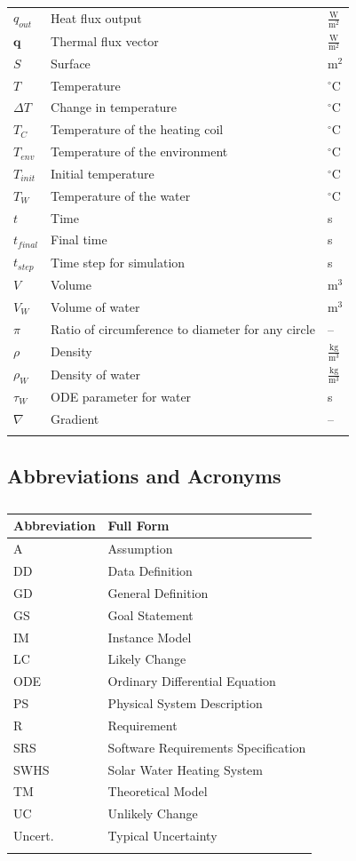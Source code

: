 \documentclass[12pt]{article}
\begin{document}
\begin{longtabu}{l X[l] l}
\\
${q_{out}}$ & Heat flux output & $\frac{\text{W}}{\text{m}^{2}}$
\\
$\mathbf{q}$ & Thermal flux vector & $\frac{\text{W}}{\text{m}^{2}}$
\\
$S$ & Surface & $\text{m}^{2}$
\\
$T$ & Temperature & ${}^{\circ}$C
\\
$ΔT$ & Change in temperature & ${}^{\circ}$C
\\
${T_{C}}$ & Temperature of the heating coil & ${}^{\circ}$C
\\
${T_{env}}$ & Temperature of the environment & ${}^{\circ}$C
\\
${T_{init}}$ & Initial temperature & ${}^{\circ}$C
\\
${T_{W}}$ & Temperature of the water & ${}^{\circ}$C
\\
$t$ & Time & s
\\
${t_{final}}$ & Final time & s
\\
${t_{step}}$ & Time step for simulation & s
\\
$V$ & Volume & $\text{m}^{3}$
\\
${V_{W}}$ & Volume of water & $\text{m}^{3}$
\\
$π$ & Ratio of circumference to diameter for any circle & --
\\
$ρ$ & Density & $\frac{\text{kg}}{\text{m}^{3}}$
\\
${ρ_{W}}$ & Density of water & $\frac{\text{kg}}{\text{m}^{3}}$
\\
${τ_{W}}$ & ODE parameter for water & s
\\
$∇$ & Gradient & --
\\
\bottomrule
\caption{}
\label{Table:ToS}
\end{longtabu}
\subsection{Abbreviations and Acronyms}
\label{Sec:TAbbAcc}
\begin{longtable}{l l}
\toprule
\textbf{Abbreviation} & \textbf{Full Form}
\\
\midrule
\endhead
A & Assumption
\\
DD & Data Definition
\\
GD & General Definition
\\
GS & Goal Statement
\\
IM & Instance Model
\\
LC & Likely Change
\\
ODE & Ordinary Differential Equation
\\
PS & Physical System Description
\\
R & Requirement
\\
SRS & Software Requirements Specification
\\
SWHS & Solar Water Heating System
\\
TM & Theoretical Model
\\
UC & Unlikely Change
\\
Uncert. & Typical Uncertainty
\\
\bottomrule
\caption{}
\label{Table:TAbbAcc}
\end{longtable}
\end{document}

